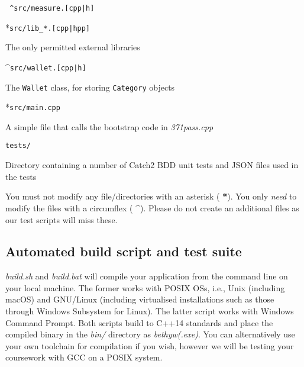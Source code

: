 \documentclass[a4paper]{article}
\begin{document}
\begin{labeling}{\texttt{{\color{blue} \^{}}src/measure.[cpp|h] }}
    \item[{\color{red} *}\texttt{src/lib\_*.[cpp|hpp]}]

    The only permitted external libraries
    
    \item[{\color{blue} \^{}}\texttt{src/wallet.[cpp|h]}]

    The \texttt{Wallet} class, for storing \texttt{Category} objects

    \item[{\color{red} *}\texttt{src/main.cpp}]

    A simple file that calls the bootstrap code in \emph{371pass.cpp}

    \item[\texttt{tests/}]

    Directory containing a number of Catch2 BDD unit tests and JSON files used in the tests
\end{labeling}

\vspace{.5cm}
You must not modify any file/directories with an asterisk (\textbf{\color{red} *}). You only \emph{need} to modify the files with a circumflex (\textbf{\color{blue} \^{}}). Please do not create an additional files as our test scripts will miss these.


\subsection*{Automated build script and test suite}\label{sec:cwk scripts}

\emph{build.sh} and \emph{build.bat} will compile your application from the command line on your local machine. The former works with POSIX OSs, i.e., Unix (including macOS) and GNU/Linux (including virtualised installations such as those through Windows Subsystem for Linux). The latter script works with Windows Command Prompt. Both scripts build to C++14 standards and place the compiled binary in the \emph{bin/} directory as \emph{bethyw(.exe)}. You can alternatively use your own toolchain for compilation if you wish, however we will be testing your coursework with GCC on a POSIX system.
\end{document}

